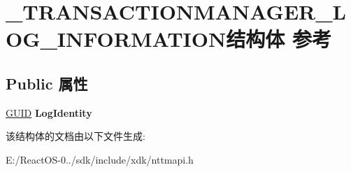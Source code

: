 \hypertarget{struct___t_r_a_n_s_a_c_t_i_o_n_m_a_n_a_g_e_r___l_o_g___i_n_f_o_r_m_a_t_i_o_n}{}\section{\+\_\+\+T\+R\+A\+N\+S\+A\+C\+T\+I\+O\+N\+M\+A\+N\+A\+G\+E\+R\+\_\+\+L\+O\+G\+\_\+\+I\+N\+F\+O\+R\+M\+A\+T\+I\+O\+N结构体 参考}
\label{struct___t_r_a_n_s_a_c_t_i_o_n_m_a_n_a_g_e_r___l_o_g___i_n_f_o_r_m_a_t_i_o_n}
\subsection*{Public 属性}
\begin{DoxyCompactItemize}
\item 
\mbox{\label{struct___t_r_a_n_s_a_c_t_i_o_n_m_a_n_a_g_e_r___l_o_g___i_n_f_o_r_m_a_t_i_o_n_a264e500163e4fd44d50edf1d25d0a1c1}} 
\hyperlink{interface_g_u_i_d}{G\+U\+ID} {\bfseries Log\+Identity}
\end{DoxyCompactItemize}


该结构体的文档由以下文件生成\+:\begin{DoxyCompactItemize}
\item 
E\+:/\+React\+O\+S-\/0../sdk/include/xdk/nttmapi.\+h\end{DoxyCompactItemize}
